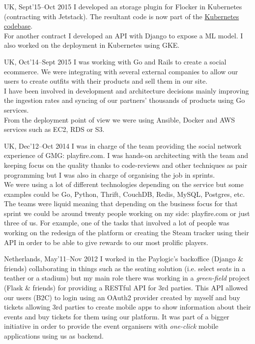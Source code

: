 \documentclass[10pt, a4paper, sans]{moderncv}
\begin{document}
{UK, Sept'15--Oct 2015}
{I developed an storage plugin for Flocker in Kubernetes (contracting with Jetstack). The resultant code is now part of the \href{https://github.com/kubernetes/kubernetes/pull/14328}{Kubernetes codebase}.\\
For another contract I developed an API with Django to expose a ML model. I also worked on the deployment in Kubernetes using GKE.\\}

{UK, Oct'14--Sept 2015}
{I was working with Go and Rails to create a social ecommerce. We were integrating with several external companies to allow our users to create outfits with their products and sell them in our site.\\
I have been involved in development and architecture decisions mainly improving the ingestion rates and syncing of our partners' thousands of products using Go services.\\
From the deployment point of view we were using Ansible, Docker and AWS services such as EC2, RDS or S3.\\}

{UK, Dec'12--Oct 2014}
{I was in charge of the team providing the social network experience of GMG: playfire.com. I was hands-on architecting with the team and keeping focus on the quality thanks to code-reviews and other techniques as pair programming but I was also in charge of organising the job in sprints.\\
We were using a lot of different technologies depending on the service but some examples could be Go, Python, Thrift, CouchDB, Redis, MySQL, Postgres, etc.\\
The teams were liquid meaning that depending on the business focus for that sprint we could be around twenty people working on my side: playfire.com or just three of us.
For example, one of the tasks that involved a lot of people was working on the redesign of the platform or creating the Steam tracker using their API in order to be able to give rewards to our most prolific players.\\}

{Netherlands, May'11--Nov 2012}
{I worked in the Paylogic's backoffice (Django \& friends) collaborating in things such as the seating solution (i.e. select seats in a teather or a stadium) but my main role there was working in a \textit{green-field} project (Flask \& friends) for providing a RESTful API for 3rd parties.
This API allowed our users (B2C) to login using an OAuth2 provider created by myself and buy tickets allowing 3rd parties to create mobile apps to show information about their events and buy tickets for them using our platform. It was part of a bigger initiative in order to provide the event organisers with \textit{one-click} mobile applications using us as backend.\\}
\end{document}
